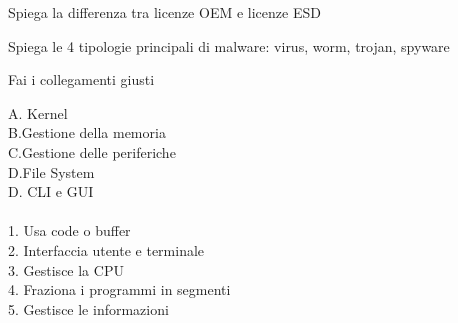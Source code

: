 \documentclass[addpoints]{exam}
\begin{document}
\begin{questions}
\question[1] Spiega la differenza tra licenze OEM e licenze ESD

\question[2] Spiega le 4 tipologie principali di malware: virus, worm, trojan, spyware

\question[1] Fai i collegamenti giusti
\begin{multicols}{2}
A. Kernel \\ B.Gestione della memoria \\ C.Gestione delle periferiche \\ D.File System \\ D. CLI e GUI \\\\
1. Usa code o buffer \\ 2. Interfaccia utente e terminale \\ 3. Gestisce la CPU \\ 4. Fraziona i programmi in segmenti \\ 5. Gestisce le informazioni
\end{multicols}


\end{questions}


\begin{center}
	\gradetable[h][questions]
\end{center}
\end{document}
